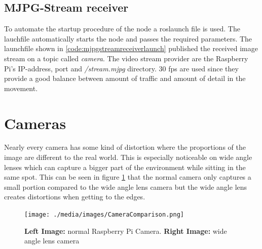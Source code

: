 \subsection{MJPG-Stream receiver}
To automate the startup procedure of the node a roslaunch file is used. The lauchfile automatically starts the node and passes the required parameters.\newline
The launchfile shown in \ref{code:mjpgstreamreceiverlaunch} published the received image stream on a topic called \textit{camera}. The video stream provider are the Raspberry Pi's IP-address, port and \textit{/stream.mjpg} directory. 30 \gls{fps} are used since they provide a good balance between amount of traffic and amount of detail in the movement.\newline



\section{Cameras\authorA}
Nearly every camera has some kind of distortion where the proportions of the image are different to the real world. This is especially noticeable on wide angle lenses which can capture a bigger part of the environment while sitting in the same spot. This can be seen in figure \ref{cameracomparison} that the normal camera only captures a small portion compared to the wide angle lens camera but the wide angle lens creates distortions when getting to the edges.\newline
\begin{figure}[h]
	\centering
	\texttt{[image: ./media/images/CameraComparison.png]}
  	\caption{\textbf{Left Image:} normal Raspberry Pi Camera. \textbf{Right Image:} wide angle lens camera}
  	\label{cameracomparison}
\end{figure}


